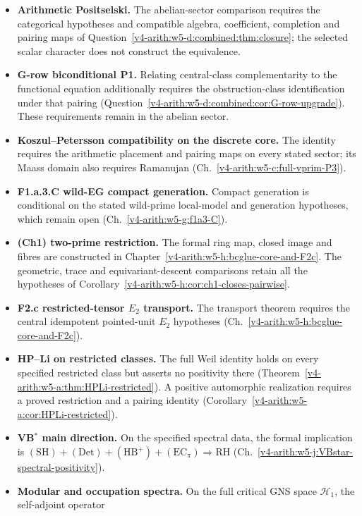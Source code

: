 \begin{itemize}
\item \textbf{Arithmetic Positselski.} The abelian-sector comparison
requires the categorical hypotheses and compatible algebra, coefficient,
completion and pairing maps of
Question~\ref{v4-arith:w5-d:combined:thm:closure}; the selected scalar character
does not construct the equivalence.
\item \textbf{G-row biconditional P1.} Relating central-class
complementarity to the functional equation additionally requires the
obstruction-class identification under that pairing
(Question~\ref{v4-arith:w5-d:combined:cor:G-row-upgrade}). These requirements
remain in the abelian sector.
\item \textbf{Koszul--Petersson compatibility on the discrete core.}
The identity requires the arithmetic placement and pairing maps on
every stated sector; its Maass domain also requires Ramanujan (Ch.~\ref{v4-arith:w5-c:full-vprim-P3}).
\item \textbf{F1.a.3.C wild-EG compact generation.} Compact generation
is conditional on the stated wild-prime local-model and generation
hypotheses, which remain open (Ch.~\ref{v4-arith:w5-g:f1a3-C}).
\item \textbf{(Ch1) two-prime restriction.} The formal ring map,
closed image and fibres are constructed in Chapter~\ref{v4-arith:w5-h:bcglue-core-and-F2c}.
The geometric, trace and equivariant-descent comparisons retain
all the hypotheses of
Corollary~\ref{v4-arith:w5-h:cor:ch1-closes-pairwise}.
\item \textbf{F2.c restricted-tensor \(E_{2}\) transport.} The
transport theorem requires the central idempotent pointed-unit
\(E_{2}\) hypotheses (Ch.~\ref{v4-arith:w5-h:bcglue-core-and-F2c}).
\item \textbf{HP--Li on restricted classes.} The full Weil identity
holds on every specified restricted class but asserts no positivity
there (Theorem~\ref{v4-arith:w5-a:thm:HPLi-restricted}). A positive
automorphic realization requires a proved restriction and a pairing
identity (Corollary~\ref{v4-arith:w5-a:cor:HPLi-restricted}).
\item \textbf{VB\(^{*}\) main direction.} On the specified spectral
data, the formal implication is
\((\mathrm{SH})+(\mathrm{Det})+(\mathrm{HB}^{+})+(\mathrm{EC}_\pi)
\Rightarrow \mathrm{RH}\) (Ch.~\ref{v4-arith:w5-j:VBstar-spectral-positivity}).
\item \textbf{Modular and occupation spectra.} On the full critical
GNS space \(\mathcal H_1\), the self-adjoint operator

\end{itemize}
